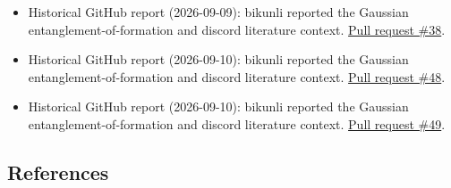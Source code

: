 \begin{itemize}
  \item Historical GitHub report (2026-09-09): bikunli reported the Gaussian entanglement-of-formation and discord literature context. \href{https://github.com/Naixu-Guo/quantum-open-problems/pull/38}{Pull request \#38}.

  \item Historical GitHub report (2026-09-10): bikunli reported the Gaussian entanglement-of-formation and discord literature context. \href{https://github.com/Naixu-Guo/quantum-open-problems/pull/48}{Pull request \#48}.

  \item Historical GitHub report (2026-09-10): bikunli reported the Gaussian entanglement-of-formation and discord literature context. \href{https://github.com/Naixu-Guo/quantum-open-problems/pull/49}{Pull request \#49}.
\end{itemize}

\subsection*{References}

